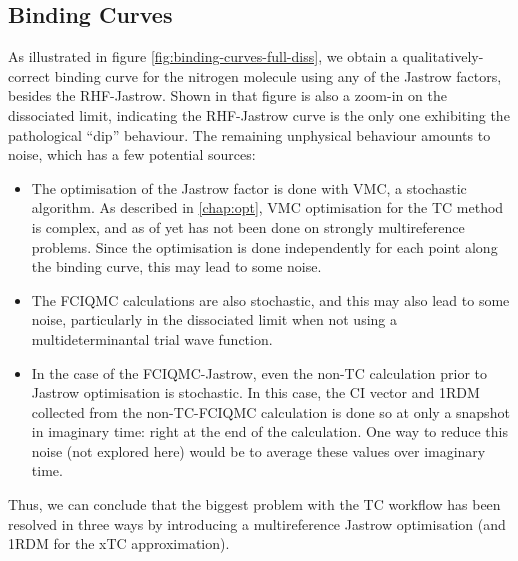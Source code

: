 \subsection{Binding Curves}

As illustrated in figure \ref{fig:binding-curves-full-diss}, we obtain a qualitatively-correct binding curve for the nitrogen molecule using any of the Jastrow factors, besides the RHF-Jastrow. Shown in that figure is also a zoom-in on the dissociated limit, indicating the RHF-Jastrow curve is the only one exhibiting the pathological ``dip'' behaviour. The remaining unphysical behaviour amounts to noise, which has a few potential sources:
\begin{itemize}
    \item The optimisation of the Jastrow factor is done with VMC, a stochastic algorithm. As described in \autoref{chap:opt}, VMC optimisation for the TC method is complex, and as of yet has not been done on strongly multireference problems. Since the optimisation is done independently for each point along the binding curve, this may lead to some noise.
    \item The FCIQMC calculations are also stochastic, and this may also lead to some noise, particularly in the dissociated limit when not using a multideterminantal trial wave function.
    \item In the case of the FCIQMC-Jastrow, even the non-TC calculation prior to Jastrow optimisation is stochastic. In this case, the CI vector and 1RDM collected from the non-TC-FCIQMC calculation is done so at only a snapshot in imaginary time: right at the end of the calculation. One way to reduce this noise (not explored here) would be to average these values over imaginary time.
\end{itemize}
Thus, we can conclude that the biggest problem with the TC workflow has been resolved in three ways by introducing a multireference Jastrow optimisation (and 1RDM for the xTC approximation).

